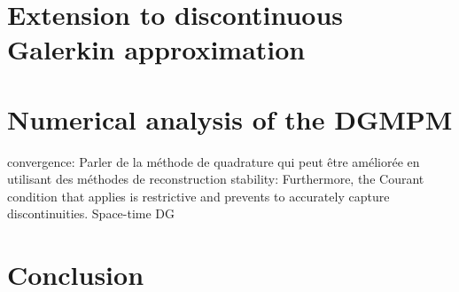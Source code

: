 \section{Extension to discontinuous Galerkin approximation}
\label{sec:DGMPM}


\section{Numerical analysis of the DGMPM}
\label{sec:DGMPM_analysis}


convergence: Parler de la méthode de quadrature qui peut être améliorée en utilisant des méthodes de  reconstruction \cite{BsplineMPM}\cite{MPM_BSpline1}
stability: Furthermore, the Courant condition that applies is restrictive \cite{Cockburn} and prevents to accurately capture discontinuities. Space-time DG



\section*{Conclusion}


